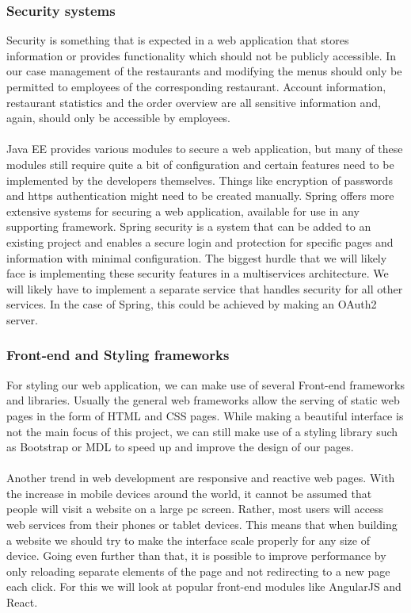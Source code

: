 \documentclass[12pt]{article}
\begin{document}
\subsubsection{Security systems}
Security is something that is expected in a web application that stores information or provides functionality which should not be publicly accessible. In our case management of the restaurants and modifying the menus should only be permitted to employees of the corresponding restaurant. Account information, restaurant statistics and the order overview are all sensitive information and, again, should only be accessible by employees.
\\\\
Java EE provides various modules to secure a web application, but many of these modules still require quite a bit of configuration and certain features need to be implemented by the developers themselves. Things like encryption of passwords and https authentication might need to be created manually. Spring offers more extensive systems for securing a web application, available for use in any supporting framework. Spring security is a system that can be added to an existing project and enables a secure login and protection for specific pages and information with minimal configuration. The biggest hurdle that we will likely face is implementing these security features in a multiservices architecture. We will likely have to implement a separate service that handles security for all other services. In the case of Spring, this could be achieved by making an OAuth2 server.

\subsubsection{Front-end and Styling frameworks}
For styling our web application, we can make use of several Front-end frameworks and libraries. Usually the general web frameworks allow the serving of static web pages in the form of HTML and CSS pages. While making a beautiful interface is not the main focus of this project, we can still make use of a styling library such as Bootstrap or MDL to speed up and improve the design of our pages.
\\\\
Another trend in web development are responsive and reactive web pages. With the increase in mobile devices around the world, it cannot be assumed that people will visit a website on a large pc screen. Rather, most users will access web services from their phones or tablet devices. This means that when building a website we should try to make the interface scale properly for any size of device. Going even further than that, it is possible to improve performance by only reloading separate elements of the page and not redirecting to a new page each click. For this we will look at popular front-end modules like AngularJS and React. 
\end{document}
